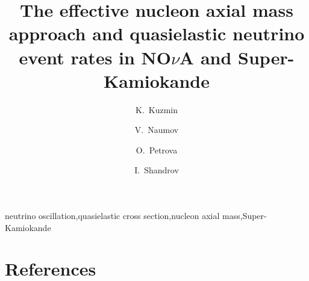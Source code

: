 \documentclass[preprint]{elsarticle}
\begin{document}
\begin{frontmatter}

\title{The effective nucleon axial mass approach and quasielastic neutrino event rates in NO$\nu$A and Super-Kamiokande}

\author[ITEP,JINR]{K.~Kuzmin}

\author[JINR]{V.~Naumov}

\author[JINR]{O.~Petrova}

\author[JINR]{I.~Shandrov}

\address[ITEP]{Institute for Theoretical and Experimental Physics, Bolshaya Cheremushkinskaya 25, RU-117218 Moscow, Russia}
\address[JINR]{Joint Institute for Nuclear Research, Joliot-Curie 6, RU-141980 Dubna, Russia}

\begin{abstract}

\end{abstract}

\begin{keyword}
neutrino oscillation\sep quasielastic cross section\sep nucleon axial mass\sep Super-Kamiokande
\end{keyword}

\end{frontmatter}

\linenumbers




%
%

\section*{References}

\end{document}

